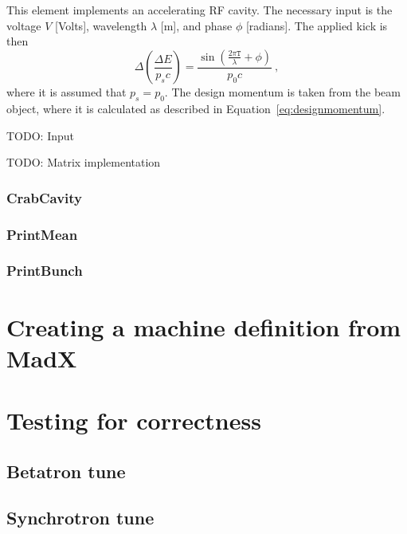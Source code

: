 \documentclass[a4paper]{report}
\begin{document}
This element implements an accelerating RF cavity.
The necessary input is the voltage $V$ [Volts], wavelength $\lambda$ [m], and phase $\phi$ [radians].
The applied kick is then
\begin{equation}
  \Delta \left(\frac{\Delta E}{p_s c}\right) = \frac{\sin\left(\frac{2\pi \mathtt{T} }{\lambda}+\phi\right)}{p_0 c}~,
\end{equation}
where it is assumed that $p_s = p_0$.
The design momentum is taken from the beam object, where it is calculated as described in Equation~\eqref{eq:designmomentum}.


TODO: Input

TODO: Matrix implementation

\subsection{CrabCavity}
\subsection{PrintMean}
\subsection{PrintBunch}

\appendix
\chapter{Creating a machine definition from MadX}
\label{sec:MadX}

\chapter{Testing for correctness}
\section{Betatron tune}

\section{Synchrotron tune}
\end{document}
